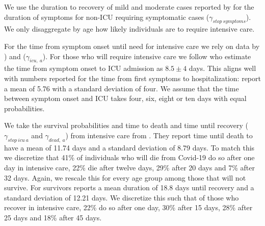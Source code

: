 
We use the duration to recovery of mild and moderate cases reported by \cite[Figure~S3,
Panel~2]{Bi2020} for the duration of symptoms for non-ICU requiring symptomatic cases
($\gamma_{stop\:symptoms}$). We only disaggregate by age how likely individuals
are to require intensive care. %

For the time from symptom onset until need for intensive care we rely on data by
\cite{Stokes2020}) and \cite{Hinch2021} ($\gamma_{icu,\:a}$). For those who will require
intensive care we follow \citet{Chen2020} who estimate the time from symptom onset to ICU
admission as $8.5 \pm 4$ days. This aligns well with numbers reported for the time from
first symptoms to hospitalization: \citet{Gaythorpe2020} report a mean of 5.76 with a
standard deviation of four. We assume that the time between symptom onset and ICU takes
four, six, eight or ten days with equal probabilities.

We take the survival probabilities and time to death and time until recovery
($\gamma_{stop\:icu\:a}$ and $\gamma_{dead,\:a}$) from intensive care from
\citet{Hinch2021}. They report time until death to have a mean of 11.74 days and a
standard deviation of 8.79 days. To match this we discretize that 41\% of individuals who
will die from Covid-19 do so after one day in intensive care, 22\% die after twelve days,
29\% after 20 days and 7\% after 32 days. Again, we rescale this for every age group
among those that will not survive. For survivors \cite{Hinch2020} reports a mean duration
of 18.8 days until recovery and a standard deviation of 12.21 days. We discretize this
such that of those who recover in intensive care, 22\% do so after one day, 30\% after 15
days, 28\% after 25 days and 18\% after 45 days.

\FloatBarrier
